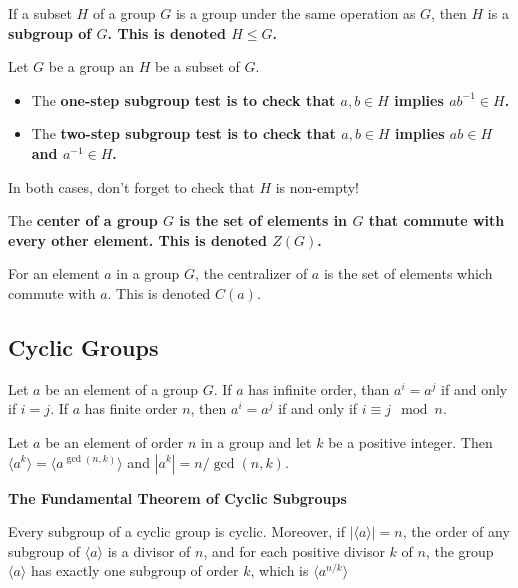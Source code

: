 \documentclass{hmwk}
\begin{document}
\begin{defn}
If a subset $H$ of a group $G$ is a group under the same operation as $G$, then $H$ is a \bf{subgroup} of $G$. This is denoted $H \leq G$.
\end{defn}

\begin{prop}
Let $G$ be a group an $H$ be a subset of $G$. 
\begin{itemize}
    \item The \bf{one-step subgroup test} is to check that $a, b \in H$ implies $ab^{-1} \in H$. 
    \item The \bf{two-step subgroup test} is to check that $a, b \in H$ implies $ab \in H$ and $a^{-1} \in H$. 
\end{itemize}

In both cases, don't forget to check that $H$ is non-empty!
\end{prop}

\begin{defn}
The \bf{center of a group} $G$ is the set of elements in $G$ that commute with every other element. This is denoted $Z(G)$.
\end{defn}

\begin{defn}
For an element $a$ in a group $G$, the centralizer of $a$ is the set of elements which commute with $a$. This is denoted $C(a)$.
\end{defn}

\subsection{Cyclic Groups}

\begin{prop}
Let $a$ be an element of a group $G$. If $a$ has infinite order, than $a^i = a^j$ if and only if $i=j$. If $a$ has finite order $n$, then $a^i = a^j$ if and only if $i \equiv j \mod n$.
\end{prop}

\begin{prop}
Let $a$ be an element of order $n$ in a group and let $k$ be a positive integer. Then $\langle a^k \rangle = \langle a^{\gcd(n, k)} \rangle $ and $|a^k| = n/\gcd(n, k)$.
\end{prop}

\begin{important}
\bf{The Fundamental Theorem of Cyclic Subgroups}

Every subgroup of a cyclic group is cyclic. Moreover, if $|\langle a \rangle| = n$, the order of any subgroup of $\langle a\rangle$ is a divisor of $n$, and for each positive divisor $k$ of $n$, the group $\langle a \rangle$ has exactly one subgroup of order $k$, which is $\langle a^{n/k} \rangle$
\end{important}
\end{document}
